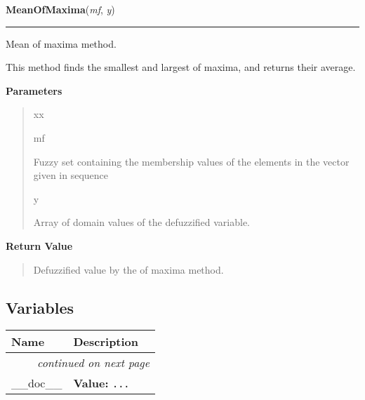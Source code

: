     \begin{boxedminipage}{\textwidth}

    \raggedright \textbf{MeanOfMaxima}(\textit{mf}, \textit{y})

    \vspace{-1.5ex}

    \rule{\textwidth}{0.5\fboxrule}

Mean of maxima method.

This method finds the smallest and largest of maxima, and returns their
average.
    \vspace{1ex}

      \textbf{Parameters}
      \begin{quote}
        \begin{Ventry}{xx}

          \item[mf]


Fuzzy set containing the membership values of the elements in the
vector given in sequence
          \item[y]


Array of domain values of the defuzzified variable.
        \end{Ventry}

      \end{quote}

    \vspace{1ex}

      \textbf{Return Value}
      \begin{quote}

Defuzzified value by the  of maxima method.
      \end{quote}

    \vspace{1ex}

    \end{boxedminipage}



  \subsection{Variables}

\begin{longtable}{|p{}|p{}|l}
\cline{1-2}
\cline{1-2} \centering \textbf{Name} & \centering \textbf{Description}& \\
\cline{1-2}
\endhead\cline{1-2}\multicolumn{3}{r}{\small\textit{continued on next page}}\\\endfoot\cline{1-2}
\endlastfoot\raggedright \_\-\_\-d\-o\-c\-\_\-\_\- & \raggedright \textbf{Value:} 
{\tt \texttt{...}}&\\
\cline{1-2}
\end{longtable}

